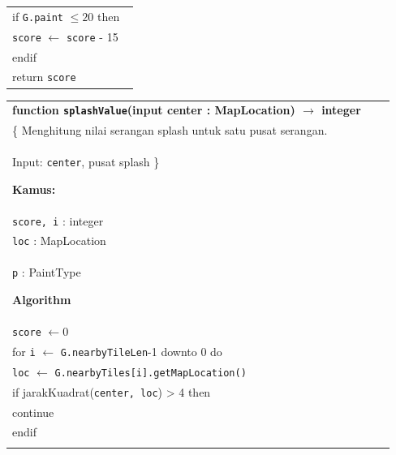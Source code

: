 \documentclass{article}
\newenvironment{pseudobox}
{
\centering
\begin{longtable}{|p{0.94\linewidth}|}
\hline
}
{
\\ \hline
\end{longtable}
\vspace{0.05cm}
}
\begin{document}
\begin{enumerate}[label=\alph*.]
\begin{enumerate}[label=\alph*.]
\begin{pseudobox}
\hspace*{1.5em}if \texttt{G.paint} $\leq 20$ then \\
\hspace*{3em}\texttt{score} $\leftarrow$ \texttt{score} - 15 \\
\hspace*{1.5em}endif \\

\hspace*{1.5em}return \texttt{score}
\end{pseudobox}

\begin{pseudobox}
\textbf{function \texttt{splashValue}(input center : MapLocation) $\rightarrow$ integer} \\
\{ Menghitung nilai serangan splash untuk satu pusat serangan. \\
Input: \texttt{center}, pusat splash
\}

\textbf{Kamus:} \\
\hspace*{1.5em}\texttt{score, i} : integer \\
\hspace*{1.5em}\texttt{loc} : MapLocation \\
\hspace*{1.5em}\texttt{p} : PaintType

\textbf{Algorithm} \\
\hspace*{1.5em}\texttt{score} $\leftarrow 0$ \\
\hspace*{1.5em}for \texttt{i} $\leftarrow$ \texttt{G.nearbyTileLen}-1 downto 0 do \\
\hspace*{3em}\texttt{loc} $\leftarrow$ \texttt{G.nearbyTiles[i].getMapLocation()} \\
\hspace*{3em}if jarakKuadrat(\texttt{center, loc}) > 4 then \\
\hspace*{4.5em}continue \\
\hspace*{3em}endif \\


\end{pseudobox}
\end{enumerate}
\end{enumerate}
\end{document}

